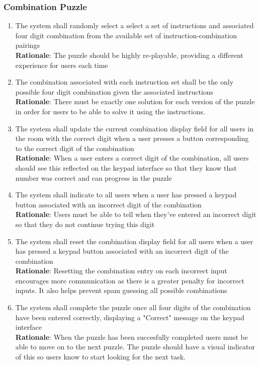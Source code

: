 \documentclass[12pt]{article}
\begin{document}
\subsubsection{Combination Puzzle}
    \begin{enumerate}[label=CP\arabic*., series=CombinationPuzzle]
        \item The system shall randomly select a select a set of instructions and associated four digit combination from the available set of instruction-combination pairings\\
        \textbf{Rationale}: The puzzle should be highly re-playable, providing a different experience for users each time
        \item The combination associated with each instruction set shall be the only possible four digit combination given the associated instructions\\
        \textbf{Rationale}: There must be exactly one solution for each version of the puzzle in order for users to be able to solve it using the instructions.
        \item The system shall update the current combination display field for all users in the room with the correct digit when a user presses a button corresponding to the correct digit of the combination\\
        \textbf{Rationale}: When a user enters a correct digit of the combination, all users should see this reflected on the keypad interface so that they know that number was correct and can progress in the puzzle
        \item The system shall indicate to all users when a user has pressed a keypad button associated with an incorrect digit of the combination\\
        \textbf{Rationale}: Users must be able to tell when they've entered an incorrect digit so that they do not continue trying this digit 
        \item The system shall reset the combination display field for all users when a user has pressed a keypad button associated with an incorrect digit of the combination\\
        \textbf{Rationale}: Resetting the combination entry on each incorrect input encourages more communication as there is a greater penalty for incorrect inputs. It also helps prevent spam guessing all possible combinations
        \item The system shall complete the puzzle once all four digits of the combination have been entered correctly, displaying a "Correct" message on the keypad interface\\
        \textbf{Rationale}: When the puzzle has been succesfully completed users must be able to move on to the next puzzle. The puzzle should have a visual indicator of this so users know to start looking for the next task.
    \end{enumerate}
\end{document}

